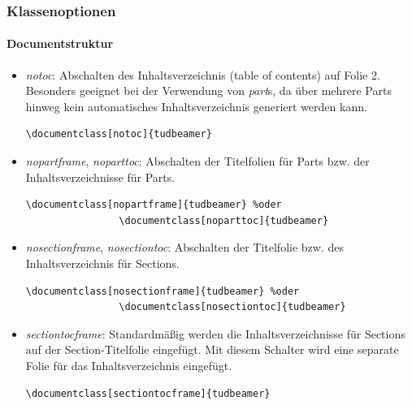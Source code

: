 \documentclass[german,notoc]{tudbeamer}%
\begin{document}
\begin{frame}[fragile]
	\frametitle{Klassenoptionen}
	\framesubtitle{Documentstruktur}

	\begin{itemize}
		\item \emph{notoc}: Abschalten des Inhaltsverzeichnis (table of contents) auf Folie 2. Besonders geeignet bei der Verwendung von \emph{part}s, da über mehrere Parts hinweg kein automatisches Inhaltsverzeichnis generiert werden kann.
			\begin{lstlisting}[gobble=8,style=latex,numbers=none]
				\documentclass[notoc]{tudbeamer}
			\end{lstlisting} 
		\item \emph{nopartframe}, \emph{noparttoc}: Abschalten der Titelfolien für Parts bzw. der Inhaltsverzeichnisse für Parts.
			\begin{lstlisting}[gobble=8,style=latex]
				\documentclass[nopartframe]{tudbeamer} %oder
				\documentclass[noparttoc]{tudbeamer} 
			\end{lstlisting} 
		\item \emph{nosectionframe}, \emph{nosectiontoc}: Abschalten der Titelfolie bzw. des Inhaltsverzeichnis für Sections.
			\begin{lstlisting}[gobble=8,style=latex]
				\documentclass[nosectionframe]{tudbeamer} %oder
				\documentclass[nosectiontoc]{tudbeamer} 
			\end{lstlisting} 
		\item \emph{sectiontocframe}: Standardmäßig werden die Inhaltsverzeichnisse für Sections auf der Section-Titelfolie eingefügt. Mit diesem Schalter wird eine separate Folie für das Inhaltsverzeichnis eingefügt.
			\begin{lstlisting}[gobble=8,style=latex,numbers=none]
				\documentclass[sectiontocframe]{tudbeamer}
			\end{lstlisting} 
	\end{itemize}
\end{frame}
\end{document}
